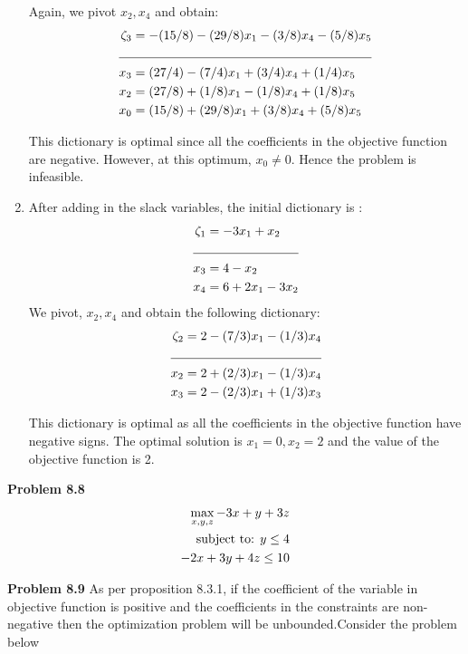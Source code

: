 \documentclass[letterpaper,12pt]{article}
\theoremstyle{definition}
\begin{document}
\begin{enumerate}
Again, we pivot $x_2, x_4$ and obtain:
\begin{align*}
  \zeta_3 &= -(15/8)- (29/8)x_1-(3/8)x_4- (5/8)x_5\\
  \cline{1-2}
  x_3 &= (27/4) - (7/4)x_1+(3/4)x_4+(1/4)x_5\\
  x_2 &= (27/8) + (1/8)x_1 -(1/8)x_4+(1/8)x_5\\
  x_0 &= (15/8) + (29/8)x_1 + (3/8)x_4 + (5/8)x_5\\
\end{align*}

This dictionary is optimal since all the coefficients in the objective function are negative. However,
at this optimum, $x_0 \ne 0$. Hence the problem is infeasible.

\item After adding in the slack variables, the initial dictionary is :
\begin{align*}
  \zeta_1 &= -3x_1+x_2\\
  \cline{1-2}
  x_3 &= 4-x_2\\
  x_4 &= 6+2x_1-3x_2\\
\end{align*}
We pivot, $x_2, x_4$ and obtain the following dictionary:
\begin{align*}
  \zeta_2 &= 2-(7/3)x_1-(1/3)x_4\\
  \cline{1-2}
  x_2 &= 2+(2/3)x_1 - (1/3)x_4\\
  x_3 &= 2-(2/3)x_1+(1/3)x_3\\
\end{align*}

This dictionary is optimal as all the coefficients in the objective function have negative signs.
The optimal solution is $x_1= 0, x_2 = 2$ and the value of the objective function is 2.
\end{enumerate}

\vspace{3mm}
\noindent\textbf{Problem 8.8}
\begin{align*}
  \max_{{x,y,z}} -3x+ y+ 3z\\
  \textnormal{subject to: } y\leq 4\\
   -2x + 3y+ 4z\leq 10\\
\end{align*}

\vspace{3mm}
\noindent\textbf{Problem 8.9}
As per proposition 8.3.1, if the coefficient of the variable in objective function is positive and the coefficients in the constraints are non-negative then the optimization problem will be unbounded.Consider the problem below
\end{document}
